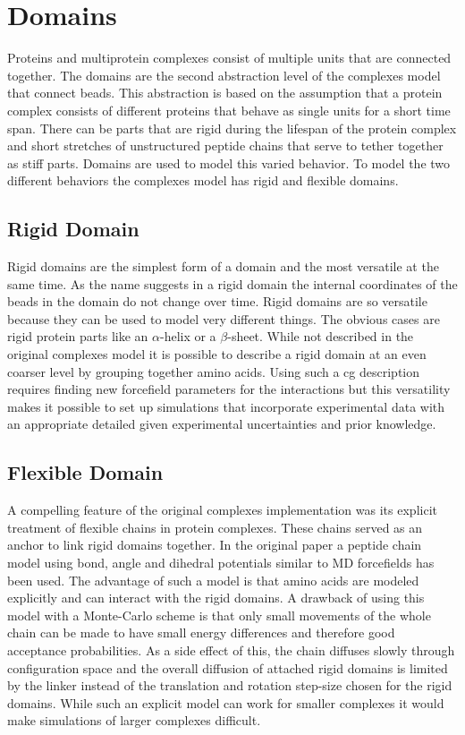 \documentclass[12pt, twoside]{report}
\begin{document}
\section{Domains}
Proteins and multiprotein complexes consist of multiple units that are connected
together. The domains are the second abstraction level of the complexes model
that connect beads. This abstraction is based on the assumption that a protein
complex consists of different proteins that behave as single units for a short
time span. There can be parts that are rigid during the lifespan of the protein
complex and short stretches of unstructured peptide chains that serve to tether
together as stiff parts. Domains are used to model this varied behavior. To
model the two different behaviors the complexes model has rigid and flexible
domains.

\subsection{Rigid Domain}
Rigid domains are the simplest form of a domain and the most versatile at the
same time. As the name suggests in a rigid domain the internal coordinates of
the beads in the domain do not change over time. Rigid domains are so versatile
because they can be used to model very different things. The obvious cases are
rigid protein parts like an $\alpha$-helix or a $\beta$-sheet. While not
described in the original complexes model it is possible to describe a rigid
domain at an even coarser level by grouping together amino acids. Using such a
\gls{cg} description requires finding new forcefield parameters for the
interactions but this versatility makes it possible to set up simulations that
incorporate experimental data with an appropriate detailed given experimental
uncertainties and prior knowledge.

\subsection{Flexible Domain}
\label{sec:flexible-domain} A compelling feature of the original complexes
implementation \cite{Kim2008} was its explicit treatment of flexible chains in
protein complexes. These chains served as an anchor to link rigid domains
together. In the original paper \cite{Kim2008} a peptide chain model using bond,
angle and dihedral potentials similar to \gls{MD} forcefields \cite{Hornak2006}
has been used. The advantage of such a model is that amino acids are modeled
explicitly and can interact with the rigid domains. A drawback of using this
model with a Monte-Carlo scheme is that only small movements of the whole chain
can be made to have small energy differences and therefore good acceptance
probabilities. As a side effect of this, the chain diffuses slowly through
configuration space and the overall diffusion of attached rigid domains is
limited by the linker instead of the translation and rotation step-size chosen
for the rigid domains. While such an explicit model can work for smaller
complexes \cite{Rozycki2011} it would make simulations of larger complexes
\cite{Kofinger2015} difficult.
\end{document}

